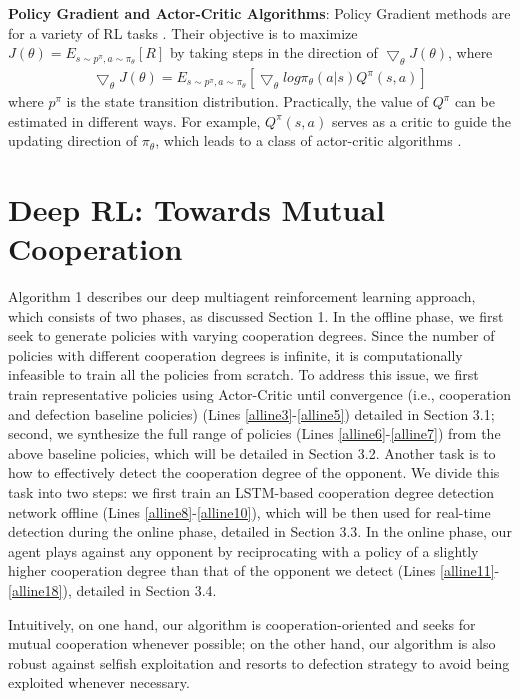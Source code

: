 \documentclass{article}
\begin{document}
\textbf{Policy Gradient and Actor-Critic Algorithms}:  Policy Gradient methods are for a variety of RL tasks \cite{williams1992simple,sutton2000policy}. Their objective is to maximize $J(\theta)=E_{s \sim p^{\pi},a \sim \pi_{\theta}}[R]$ by taking steps in the direction of $\bigtriangledown _{\theta}J(\theta)$, where
\begin{eqnarray}
\bigtriangledown _{\theta}J(\theta) = E_{s \sim p^{\pi},a \sim \pi_{\theta}}[\bigtriangledown_{\theta}log\pi_{\theta}(a|s)Q^{\pi}(s,a)]
\end{eqnarray}
where $p^{\pi}$ is the state transition distribution. Practically, the value of $Q^{\pi}$ can be estimated in different ways. For example, $Q^{\pi}(s,a)$ serves as a critic to guide the updating direction of $\pi_{\theta}$, which leads to a class of actor-critic algorithms \cite{schulman2015high,wang2016sample}.


\section{Deep RL: Towards Mutual Cooperation}

Algorithm 1 describes our deep multiagent reinforcement learning approach, which consists of two phases, as discussed Section 1.
In the offline phase, we first seek to generate policies with varying cooperation degrees. Since the number of policies with different cooperation degrees is infinite, it is computationally infeasible to train all the policies from scratch. To address this issue, we first train representative policies using Actor-Critic until convergence (i.e., cooperation and defection baseline policies) (Lines \ref{alline3}-\ref{alline5}) detailed in Section 3.1; second, we synthesize the full range of policies (Lines \ref{alline6}-\ref{alline7}) from the above baseline policies, which will be detailed in Section 3.2. Another task is to how to effectively detect the cooperation degree of the opponent. We divide this task into two steps: we first train an LSTM-based cooperation degree detection network offline (Lines \ref{alline8}-\ref{alline10}), which will be then used for real-time detection during the online phase, detailed in Section 3.3. In the online phase, our agent plays against any opponent by reciprocating with a policy of a slightly higher cooperation degree than that of the opponent we detect (Lines \ref{alline11}-\ref{alline18}), detailed in Section 3.4.
\begin{comment}
The high-level idea of our online learning strategy can be understood as an extension of Tit-for-Tat principle into sequential prisoner's dilemma scenarios. Our strategy adaptively selects its policy with proper cooperation degree from a continuous range of candidates based on the detected cooperation degree of an opponent.
\end{comment}
Intuitively, on one hand, our algorithm is cooperation-oriented and seeks for mutual cooperation whenever possible; on the other hand, our algorithm is also robust against selfish exploitation and resorts to defection strategy to avoid being exploited whenever necessary.
\end{document}

